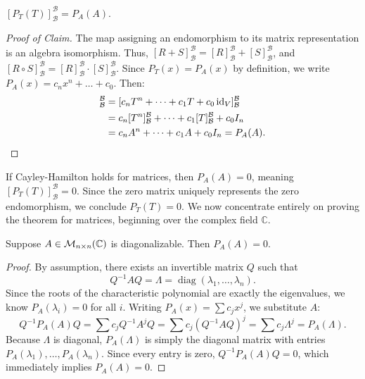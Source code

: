 \begin{claim*}\label{claim:matrix_poly}
  $[P_T(T)]_{\mathcal{B}}^{\mathcal{B}} = P_A(A)$.
\end{claim*}

\begin{proof}[Proof of Claim]
  The map assigning an endomorphism to its matrix representation is an algebra isomorphism. Thus, $[R+S]_{\mathcal{B}}^{\mathcal{B}} = [R]_{\mathcal{B}}^{\mathcal{B}} + [S]_{\mathcal{B}}^{\mathcal{B}}$, and $[R \circ S]_{\mathcal{B}}^{\mathcal{B}} = [R]_{\mathcal{B}}^{\mathcal{B}} \cdot [S]_{\mathcal{B}}^{\mathcal{B}}$.
  Since $P_T(x) = P_A(x)$ by definition, we write $P_A(x) = c_n x^n + \dots + c_0$. Then:
  \begin{align*}
    [P_T(T)]_{\mathcal{B}}^{\mathcal{B}} &= [c_n T^n + \dots + c_1 T + c_0 \id_V]_{\mathcal{B}}^{\mathcal{B}} \\
    &= c_n [T^n]_{\mathcal{B}}^{\mathcal{B}} + \dots + c_1 [T]_{\mathcal{B}}^{\mathcal{B}} + c_0 I_n \\
    &= c_n A^n + \dots + c_1 A + c_0 I_n = P_A(A).
  \end{align*}
\end{proof}

If Cayley-Hamilton holds for matrices, then $P_A(A) = 0$, meaning $[P_T(T)]_{\mathcal{B}}^{\mathcal{B}} = 0$. Since the zero matrix uniquely represents the zero endomorphism, we conclude $P_T(T) = 0$. We now concentrate entirely on proving the theorem for matrices, beginning over the complex field $\mathbb{C}$.

\begin{lemma}\label{lemma:cayley_diagonalizable}
  Suppose $A \in \mathcal{M}_{n \times n}(\mathbb{C})$ is diagonalizable. Then $P_A(A) = 0$.
\end{lemma}

\begin{proof}
  By assumption, there exists an invertible matrix $Q$ such that 
  \[Q^{-1} A Q = \Lambda = \operatorname{diag}(\lambda_1, \dots, \lambda_n). \] 
  Since the roots of the characteristic polynomial are exactly the eigenvalues, we know $P_A(\lambda_i) = 0$ for all $i$. Writing $P_A(x) = \sum c_j x^j$, we substitute $A$:
  \[
  Q^{-1} P_A(A) Q = \sum c_j Q^{-1} A^j Q = \sum c_j (Q^{-1} A Q)^j = \sum c_j \Lambda^j = P_A(\Lambda).
  \]
  Because $\Lambda$ is diagonal, $P_A(\Lambda)$ is simply the diagonal matrix with entries $P_A(\lambda_1), \dots, P_A(\lambda_n)$. Since every entry is zero, $Q^{-1} P_A(A) Q = 0$, which immediately implies $P_A(A) = 0$.
\end{proof}

